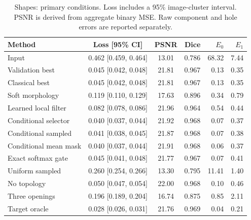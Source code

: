 \begin{table}[htbp]

\centering\small

\caption{Shapes: primary conditions. Loss includes a 95\% image-cluster interval. PSNR is derived from aggregate binary MSE. Raw component and hole errors are reported separately.}

\begin{tabular}{lccrrr}

\toprule Method & Loss [95\% CI] & PSNR & Dice & $E_0$ & $E_1$\\\midrule

Input & 0.462 [0.459, 0.464] & 13.01 & 0.786 & 68.32 & 7.44\\

Validation best & 0.045 [0.042, 0.048] & 21.81 & 0.967 & 0.13 & 0.35\\

Classical best & 0.045 [0.042, 0.048] & 21.81 & 0.967 & 0.13 & 0.35\\

Soft morphology & 0.119 [0.110, 0.129] & 17.63 & 0.896 & 0.34 & 0.79\\

Learned local filter & 0.082 [0.078, 0.086] & 21.96 & 0.964 & 0.54 & 0.44\\

Conditional selector & 0.040 [0.037, 0.044] & 21.92 & 0.968 & 0.07 & 0.37\\

Conditional sampled & 0.041 [0.038, 0.045] & 21.87 & 0.968 & 0.07 & 0.38\\

Conditional mean mask & 0.040 [0.037, 0.044] & 21.91 & 0.968 & 0.06 & 0.37\\

Exact softmax gate & 0.045 [0.041, 0.048] & 21.77 & 0.967 & 0.07 & 0.41\\

Uniform sampled & 0.260 [0.254, 0.266] & 13.30 & 0.795 & 11.41 & 1.40\\

No topology & 0.050 [0.047, 0.054] & 22.00 & 0.968 & 0.10 & 0.46\\

Three openings & 0.196 [0.189, 0.204] & 16.74 & 0.875 & 0.85 & 2.11\\

Target oracle & 0.028 [0.026, 0.031] & 21.76 & 0.969 & 0.04 & 0.21\\

\bottomrule\end{tabular}

\end{table}

